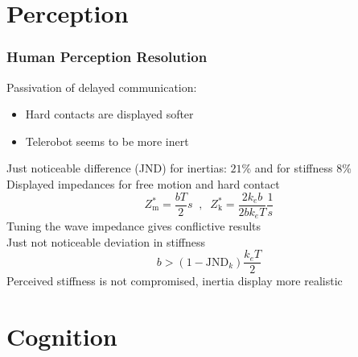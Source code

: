 \documentclass[student]{ITRslides}
\newcommand{\g}[1]{\text{#1}}
\begin{document}
\begin{frame}
			



\end{frame}


\section{Perception}

\begin{frame}
	\frametitle{Human Perception Resolution}
Passivation of delayed communication:
\begin{itemize}
\item Hard contacts are displayed softer
\item Telerobot seems to be more inert
\end{itemize}
Just noticeable difference (JND) for inertias: $21$\% and for stiffness $8$\%\\
Displayed impedances for free motion and hard contact
\[Z_\mathrm{m}^* = \frac{bT}{2} s \;\; , \;\; Z_\mathrm{k}^* = \frac{2k_eb}{2bk_e T}\frac{1}{s}
\]
Tuning the wave impedance gives conflictive results\\
Just not noticeable deviation in stiffness
\[b > (1-\text{JND}_k) \frac{k_e T}{2}\]
Perceived stiffness is not compromised, inertia display more realistic


\end{frame}


\section{Cognition}
\end{document}
